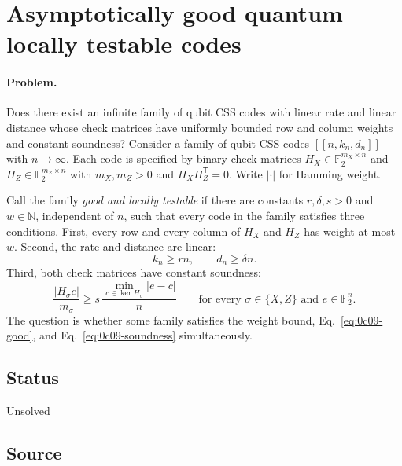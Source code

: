 \section{Asymptotically good quantum locally testable codes}
\label{sec:op_0c091a6b5a55a8fd}

\paragraph{Problem.}
Does there exist an infinite family of qubit CSS codes with linear rate and
linear distance whose check matrices have uniformly bounded row and column
weights and constant soundness?  Consider a family of qubit CSS codes
$[[n,k_n,d_n]]$ with $n\to\infty$.  Each code is specified by binary check
matrices $H_X\in\mathbb{F}_2^{m_X\times n}$ and
$H_Z\in\mathbb{F}_2^{m_Z\times n}$ with $m_X,m_Z>0$ and
$H_XH_Z^{\mathsf T}=0$.  Write $|\cdot|$ for Hamming weight.

Call the family \emph{good and locally testable} if there are constants
$r,\delta,s>0$ and $w\in\mathbb{N}$, independent of $n$, such that every code
in the family satisfies three conditions.  First, every row and every column
of $H_X$ and $H_Z$ has weight at most $w$.  Second, the rate and distance are
linear:
\begin{equation}
  k_n\ge rn,\qquad d_n\ge\delta n.
  \label{eq:0c09-good}
\end{equation}
Third, both check matrices have constant soundness:
\begin{equation}
  \frac{|H_\sigma e|}{m_\sigma}
  \ge
  s\,\frac{\min_{c\in\ker H_\sigma}|e-c|}{n}
  \qquad
  \text{for every }\sigma\in\{X,Z\}\text{ and }e\in\mathbb{F}_2^n.
  \label{eq:0c09-soundness}
\end{equation}
The question is whether some family satisfies the weight bound,
Eq.~\eqref{eq:0c09-good}, and Eq.~\eqref{eq:0c09-soundness} simultaneously.

\subsection*{Status}

Unsolved

\subsection*{Source}

